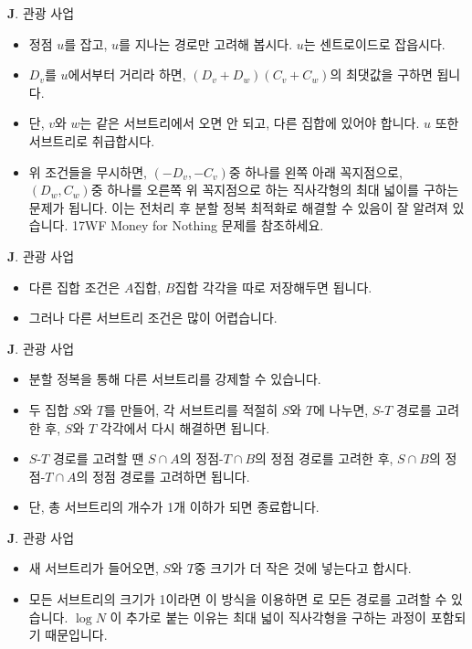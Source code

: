 \begin{frame}{\textbf{J}. 관광 사업}
    \begin{itemize}
        \item 정점 $u$를 잡고, $u$를 지나는 경로만 고려해 봅시다. $u$는 센트로이드로 잡읍시다.
        \item $D_v$를 $u$에서부터 거리라 하면, $(D_v+D_w)(C_v+C_w)$의 최댓값을 구하면 됩니다.
        \item 단, $v$와 $w$는 같은 서브트리에서 오면 안 되고, 다른 집합에 있어야 합니다. $u$ 또한 서브트리로 취급합시다.
        \item 위 조건들을 무시하면, $(-D_v,-C_v)$중 하나를 왼쪽 아래 꼭지점으로, $(D_w,C_w)$중 하나를 오른쪽 위 꼭지점으로 하는 직사각형의 최대 넓이를 구하는 문제가 됩니다. 이는 전처리 후 분할 정복 최적화로 해결할 수 있음이 잘 알려져 있습니다. 17WF Money for Nothing 문제를 참조하세요.
    \end{itemize}
\end{frame}
\begin{frame}{\textbf{J}. 관광 사업}
    \begin{itemize}
        \item 다른 집합 조건은 $A$집합, $B$집합 각각을 따로 저장해두면 됩니다.
        \item 그러나 다른 서브트리 조건은 많이 어렵습니다.
    \end{itemize}
\end{frame}
\begin{frame}{\textbf{J}. 관광 사업}
    \begin{itemize}
        \item 분할 정복을 통해 다른 서브트리를 강제할 수 있습니다.
        \item 두 집합 $S$와 $T$를 만들어, 각 서브트리를 적절히 $S$와 $T$에 나누면, $S$-$T$ 경로를 고려한 후, $S$와 $T$ 각각에서 다시 해결하면 됩니다.
        \item $S$-$T$ 경로를 고려할 땐 $S \cap A$의 정점-$T \cap B$의 정점 경로를 고려한 후, $S \cap B$의 정점-$T \cap A$의 정점 경로를 고려하면 됩니다.
        \item 단, 총 서브트리의 개수가 1개 이하가 되면 종료합니다.
    \end{itemize}
\end{frame}
\begin{frame}{\textbf{J}. 관광 사업}
    \begin{itemize}
        \item 새 서브트리가 들어오면, $S$와 $T$중 크기가 더 작은 것에 넣는다고 합시다.
        \item 모든 서브트리의 크기가 1이라면 이 방식을 이용하면 로 모든 경로를 고려할 수 있습니다. $\log N$ 이 추가로 붙는 이유는 최대 넓이 직사각형을 구하는 과정이 포함되기 때문입니다.
    \end{itemize}
\end{frame}
